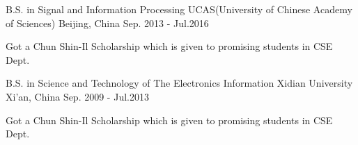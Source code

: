 

\begin{cventries}

  \cventry
    {B.S. in Signal and Information Processing} %
    {UCAS(University of Chinese Academy of Sciences)} %
    {Beijing, China} %
    {Sep. 2013 - Jul.2016} %
    {
      \begin{cvitems} %
        \item {Got a Chun Shin-Il Scholarship which is given to promising students in CSE Dept.}
      \end{cvitems}
    }

  \cventry
    {B.S. in Science and Technology of The Electronics Information} %
    {Xidian University} %
    {Xi'an, China} %
    {Sep. 2009 - Jul.2013} %
    {
      \begin{cvitems} %
        \item {Got a Chun Shin-Il Scholarship which is given to promising students in CSE Dept.}
      \end{cvitems}
    }

\end{cventries}
